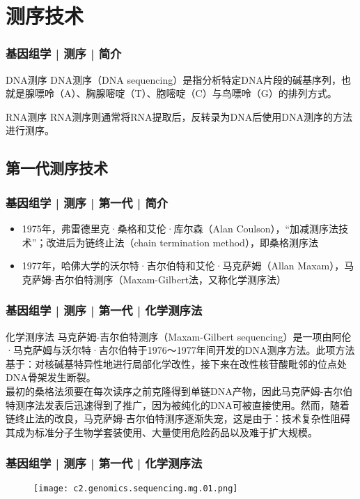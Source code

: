\section{测序技术}
\begin{frame}
  \frametitle{基因组学 | 测序 | 简介}
  \begin{block}{DNA测序}
DNA测序（DNA sequencing）是指分析特定DNA片段的碱基序列，也就是腺嘌呤（A）、胸腺嘧啶（T）、胞嘧啶（C）与鸟嘌呤（G）的排列方式。
  \end{block}
  \pause
  \begin{block}{RNA测序}
RNA测序则通常将RNA提取后，反转录为DNA后使用DNA测序的方法进行测序。
  \end{block}
\end{frame}

\subsection{第一代测序技术}
\begin{frame}
  \frametitle{基因组学 | 测序 | 第一代 | 简介}
   \begin{itemize}
     \item 1975年，弗雷德里克·桑格和艾伦·库尔森（Alan Coulson），“加减测序法技术”；改进后为链终止法（chain termination method），即桑格测序法
     \item 1977年，哈佛大学的沃尔特·吉尔伯特和艾伦·马克萨姆（Allan Maxam），马克萨姆-吉尔伯特测序（Maxam-Gilbert法，又称化学测序法）
   \end{itemize} 
\end{frame}

\begin{frame}
  \frametitle{基因组学 | 测序 | 第一代 | 化学测序法}
  \begin{block}{化学测序法}
马克萨姆-吉尔伯特测序（Maxam-Gilbert sequencing）是一项由阿伦·马克萨姆与沃尔特·吉尔伯特于1976～1977年间开发的DNA测序方法。此项方法基于：对核碱基特异性地进行局部化学改性，接下来在改性核苷酸毗邻的位点处DNA骨架发生断裂。\\
\vspace{1em}
最初的桑格法须要在每次读序之前克隆得到单链DNA产物，因此马克萨姆-吉尔伯特测序法发表后迅速得到了推广，因为被纯化的DNA可被直接使用。然而，随着链终止法的改良，马克萨姆-吉尔伯特测序逐渐失宠，这是由于：技术复杂性阻碍其成为标准分子生物学套装使用、大量使用危险药品以及难于扩大规模。
  \end{block}
\end{frame}

\begin{frame}
  \frametitle{基因组学 | 测序 | 第一代 | 化学测序法}
  \begin{figure}
    \centering
    \texttt{[image: c2.genomics.sequencing.mg.01.png]}
  \end{figure}
\end{frame}

